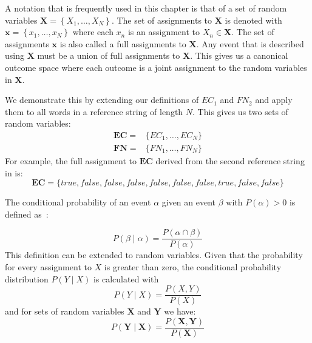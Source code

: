 \bigskip

A notation that is frequently used in this chapter is that of a set of \glspl{random variable} $\mathbf{X}=\left\{ X_1,\dots,X_N\right\}$.
The set of assignments to $\mathbf{X}$ is denoted with $\mathbf{x}=\left\{ x_1,\dots,x_N\right\}$ where each $x_n$ is an \gls{assignment} to $X_n\in\mathbf{X}$.
The set of assignments $\mathbf{x}$ is also called a \glspl{full assignment} to $\mathbf{X}$.
Any \gls{event} that is described using $\mathbf{X}$ must be a union of \glspl{full assignment} to $\mathbf{X}$.
This gives us a \gls{canonical outcome space} where each outcome is a joint assignment to the \glspl{random variable} in $\mathbf{X}$.

We demonstrate this by extending our definitions of $EC_1$ and $FN_2$ and apply them to all words in a reference string of length $N$.
This gives us two sets of \glspl{random variable}:
\begin{equation*}
  \begin{split}
    \mathbf{EC}=& \{EC_1, \dots, EC_N\}\\
    \mathbf{FN}=& \{FN_1, \dots, FN_N\}
  \end{split}
\end{equation*}
For example, the full assignment to $\mathbf{EC}$ derived from the second reference string in  is:
\begin{equation*}
  \mathbf{EC}=\{true, false, false, false, false, false, false, true, false, false\}
\end{equation*}

\bigskip

The \gls{conditional probability} of an \gls{event} $\alpha$ given an \gls{event} $\beta$ with $P(\alpha)>0$ is defined as~\cite{koller2009probabilistic}:

\begin{equation}
\label{equ:conditional-probability-event}
P(\beta\mid\alpha) = \frac{P(\alpha\cap\beta)}{P(\alpha)}
\end{equation}
This definition can be extended to \glspl{random variable}.
Given that the probability for every assignment to $X$ is greater than zero, the \gls{conditional probability distribution} $P(Y\mid X)$ is calculated with
\begin{equation}
\label{equ:conditional-probability-random-variable}
P(Y\mid X) = \frac{P(X,Y)}{P(X)}
\end{equation}
and for sets of \glspl{random variable} $\mathbf{X}$ and $\mathbf{Y}$ we have:
\begin{equation}
\label{equ:conditional-probability-random-variable}
P(\mathbf{Y}\mid \mathbf{X}) = \frac{P(\mathbf{X},\mathbf{Y})}{P(\mathbf{X})}
\end{equation}

